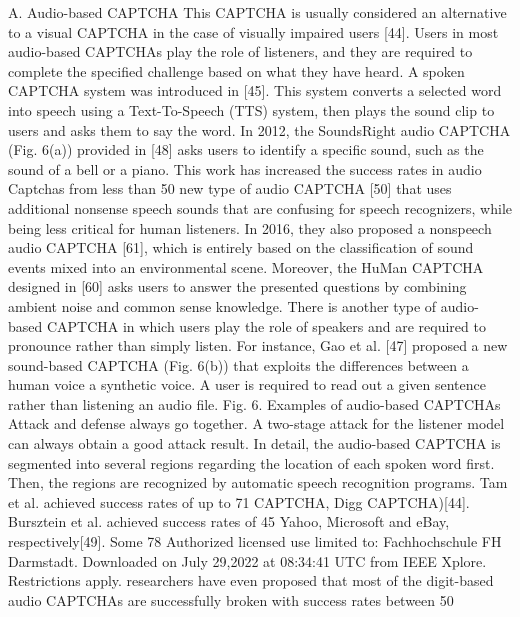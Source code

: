A. Audio-based CAPTCHA
This CAPTCHA is usually considered an alternative to a
visual CAPTCHA in the case of visually impaired users [44].
Users in most audio-based CAPTCHAs play the role of
listeners, and they are required to complete the specified
challenge based on what they have heard. A spoken
CAPTCHA system was introduced in [45]. This system
converts a selected word into speech using a Text-To-Speech
(TTS) system, then plays the sound clip to users and asks them
to say the word. In 2012, the SoundsRight audio CAPTCHA
(Fig. 6(a)) provided in [48] asks users to identify a specific
sound, such as the sound of a bell or a piano. This work has
increased the success rates in audio Captchas from less than
50%
new type of audio CAPTCHA [50] that uses additional
nonsense speech sounds that are confusing for speech
recognizers, while being less critical for human listeners. In
2016, they also proposed a nonspeech audio CAPTCHA [61],
which is entirely based on the classification of sound events
mixed into an environmental scene. Moreover, the HuMan
CAPTCHA designed in [60] asks users to answer the
presented questions by combining ambient noise and common
sense knowledge. There is another type of audio-based
CAPTCHA in which users play the role of speakers and are
required to pronounce rather than simply listen. For instance,
Gao et al. [47] proposed a new sound-based CAPTCHA (Fig.
6(b)) that exploits the differences between a human voice a
synthetic voice. A user is required to read out a given sentence
rather than listening an audio file.
Fig. 6. Examples of audio-based CAPTCHAs
Attack and defense always go together. A two-stage attack
for the listener model can always obtain a good attack result.
In detail, the audio-based CAPTCHA is segmented into
several regions regarding the location of each spoken word
first. Then, the regions are recognized by automatic speech
recognition programs. Tam et al. achieved success rates of up
to 71%
CAPTCHA, Digg CAPTCHA)[44]. Bursztein et al. achieved
success rates of 45%
Yahoo, Microsoft and eBay, respectively[49]. Some
78
Authorized licensed use limited to: Fachhochschule FH Darmstadt. Downloaded on July 29,2022 at 08:34:41 UTC from IEEE Xplore. Restrictions apply.
researchers have even proposed that most of the digit-based
audio CAPTCHAs are successfully broken with success rates
between 50%

